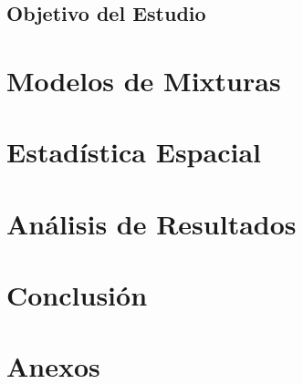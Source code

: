 \documentclass[12pt,oneside]{book} %
\begin{document}
\section{Objetivo del Estudio}



\chapter{Modelos de Mixturas}

\chapter{Estadística Espacial}

\chapter{Análisis de Resultados}

\chapter{Conclusión}


\cleardoublepage
{}
{}
\setlength{\bibsep}{18pt}



\chapter*{Anexos}
\end{document}
